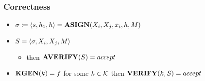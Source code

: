 \begin{frame}
	\frametitle{Correctness}

	\begin{itemize}
		\item $\sigma\coloneqq\langle s,h_1,h \rangle=\textbf{ASIGN}(X_i, X_j,x_i,h,M)$
		\item $S=\langle \sigma, X_i, X_j,M \rangle$
			\begin{itemize}
				\item then $\textbf{AVERIFY}(S) = accept$
			\end{itemize} 
		\item $\textbf{KGEN}(k) = f$ for some $k\in\mathcal{K}$ then $\textbf{VERIFY}(k,S) = accept$
	\end{itemize}
\end{frame}